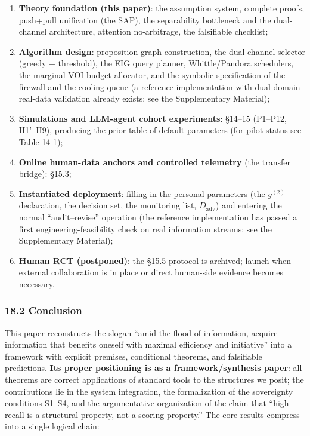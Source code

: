 \documentclass[
  11pt]{article}
\providecommand{\tightlist}{%
  \setlength{\itemsep}{0pt}\setlength{\parskip}{0pt}}
\begin{document}
\begin{enumerate}
\def\labelenumi{\arabic{enumi}.}
\tightlist
\item
  \textbf{Theory foundation (this paper)}: the assumption system,
  complete proofs, push+pull unification (the SAP), the separability
  bottleneck and the dual-channel architecture, attention no-arbitrage,
  the falsifiable checklist;
\item
  \textbf{Algorithm design}: proposition-graph construction, the
  dual-channel selector (greedy + threshold), the EIG query planner,
  Whittle/Pandora schedulers, the marginal-VOI budget allocator, and the
  symbolic specification of the firewall and the cooling queue (a
  reference implementation with dual-domain real-data validation already
  exists; see the Supplementary Material);
\item
  \textbf{Simulations and LLM-agent cohort experiments}: §14--15
  (P1--P12, H1'--H9), producing the prior table of default parameters
  (for pilot status see Table 14-1);
\item
  \textbf{Online human-data anchors and controlled telemetry} (the
  transfer bridge): §15.3;
\item
  \textbf{Instantiated deployment}: filling in the personal parameters
  (the \(g^{(2)}\) declaration, the decision set, the monitoring list,
  \(D_{\mathrm{adv}}\)) and entering the normal ``audit--revise''
  operation (the reference implementation has passed a first
  engineering-feasibility check on real information streams; see the
  Supplementary Material);
\item
  \textbf{Human RCT (postponed)}: the §15.5 protocol is archived; launch
  when external collaboration is in place or direct human-side evidence
  becomes necessary.
\end{enumerate}

\subsubsection{18.2 Conclusion}\label{conclusion}

This paper reconstructs the slogan ``amid the flood of information,
acquire information that benefits oneself with maximal efficiency and
initiative'' into a framework with explicit premises, conditional
theorems, and falsifiable predictions. \textbf{Its proper positioning is
as a framework/synthesis paper}: all theorems are correct applications
of standard tools to the structures we posit; the contributions lie in
the system integration, the formalization of the sovereignty conditions
S1--S4, and the argumentative organization of the claim that ``high
recall is a structural property, not a scoring property.'' The core
results compress into a single logical chain:
\end{document}
